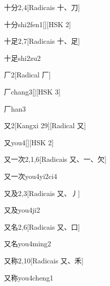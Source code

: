 \begin{entry}{十分}{2,4}[Radicais ⼗、⼑]
  \begin{phonetics}{十分}{shi2fen1}[][HSK 2]
  \end{phonetics}
\end{entry}

\begin{entry}{十足}{2,7}[Radicais ⼗、⾜]
  \begin{phonetics}{十足}{shi2zu2}
  \end{phonetics}
\end{entry}

\begin{entry}{厂}{2}[Radical ⼚]
  \begin{phonetics}{厂}{chang3}[][HSK 3]
  \end{phonetics}
  \begin{phonetics}{厂}{han3}
  \end{phonetics}
\end{entry}

\begin{entry}{又}{2}[Kangxi 29][Radical ⼜]
  \begin{phonetics}{又}{you4}[][HSK 2]
  \end{phonetics}
\end{entry}

\begin{entry}{又一次}{2,1,6}[Radicais ⼜、⼀、⽋]
  \begin{phonetics}{又一次}{you4yi2ci4}
  \end{phonetics}
\end{entry}

\begin{entry}{又及}{2,3}[Radicais ⼜、⼃]
  \begin{phonetics}{又及}{you4ji2}
  \end{phonetics}
\end{entry}

\begin{entry}{又名}{2,6}[Radicais ⼜、⼝]
  \begin{phonetics}{又名}{you4ming2}
  \end{phonetics}
\end{entry}

\begin{entry}{又称}{2,10}[Radicais ⼜、⽲]
  \begin{phonetics}{又称}{you4cheng1}
  \end{phonetics}
\end{entry}


